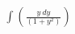 \documentclass[preview]{standalone}
\begin{document}
\begin{align*}
\int \left( \frac{y \  dy}{\left( 1 + {y}^{2} \right)} \right)
\end{align*}
\end{document}
